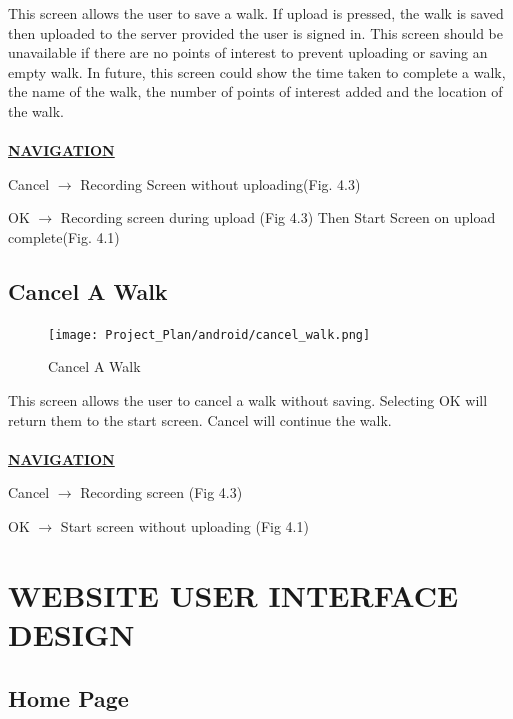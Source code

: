 \documentclass[12pt]{article}
\begin{document}
\par{This screen allows the user to save a walk. If upload is pressed, the walk is saved then uploaded to the server provided the user is signed in. This screen should be unavailable if there are no points of interest to prevent uploading or saving an empty walk. In future, this screen could show the time taken to complete a walk, the name of the walk, the number of points of interest added and the location of the walk. \\ \\}
\textbf{\uline{NAVIGATION}}
\par{Cancel $\rightarrow$ Recording Screen without uploading(Fig. 4.3)}
\par{OK $\rightarrow$ Recording screen during upload (Fig 4.3) Then Start Screen on upload complete(Fig. 4.1)}
\newpage
\subsection{Cancel A Walk}
\begin{figure}[htp]
\centering
\texttt{[image: Project\_Plan/android/cancel\_walk.png]}
\caption{Cancel A Walk}
\label{Cancel A Walk}
\end{figure}
\par{This screen allows the user to cancel a walk without saving. Selecting OK will return them to the start screen. Cancel will continue the walk. \\ \\}
\textbf{\uline{NAVIGATION}}
\par{Cancel $\rightarrow$ Recording screen (Fig 4.3)}
\par{OK $\rightarrow$ Start screen without uploading (Fig 4.1)}
\newpage
\section{WEBSITE USER INTERFACE DESIGN}
\subsection{Home Page}
\end{document}
